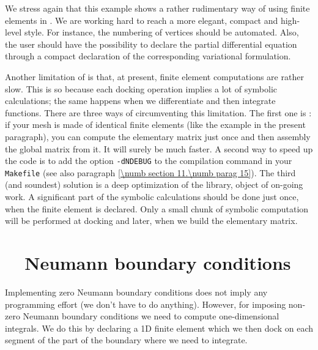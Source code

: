 We stress again that this example shows a rather rudimentary way of using finite elements in
\maniFEM.
We are working hard to reach a more elegant, compact and high-level style.
For instance, the numbering of vertices should be automated.
Also, the user should have the possibility to declare the partial differential equation
through a compact declaration of the corresponding variational formulation.

Another limitation of {\maniFEM} is that, at present, finite element computations
are rather slow.
This is so because each docking operation implies a lot of symbolic calculations;
the same happens when we differentiate and then integrate functions.
There are three ways of circumventing this limitation.
The first one is : if your mesh is made of identical finite elements
(like the example in the present paragraph), you can compute the elementary matrix
just once and then assembly the global matrix from it.
It will surely be much faster.
A second way to speed up the code is to add the option {\small\tt -dNDEBUG} to the compilation
command in your {\small\tt Makefile} (see also paragraph \ref{\numb section 11.\numb parag 15}).
The third (and soundest) solution is a deep optimization of the {\maniFEM} library,
object of on-going work.
A significant part of the symbolic calculations should be done just once,
when the finite element is declared.
Only a small chunk of symbolic computation will be performed at docking and
later, when we build the elementary matrix.


\section{~~Neumann boundary conditions}\label{\numb section 6.\numb parag 3}

Implementing zero Neumann boundary conditions does not imply any programming effort
(we don't have to do anything).
However, for imposing non-zero Neumann boundary conditions we need to compute one-dimensional
integrals.
We do this by declaring a 1D finite element which we then dock on each segment of the
part of the boundary where we need to integrate.

